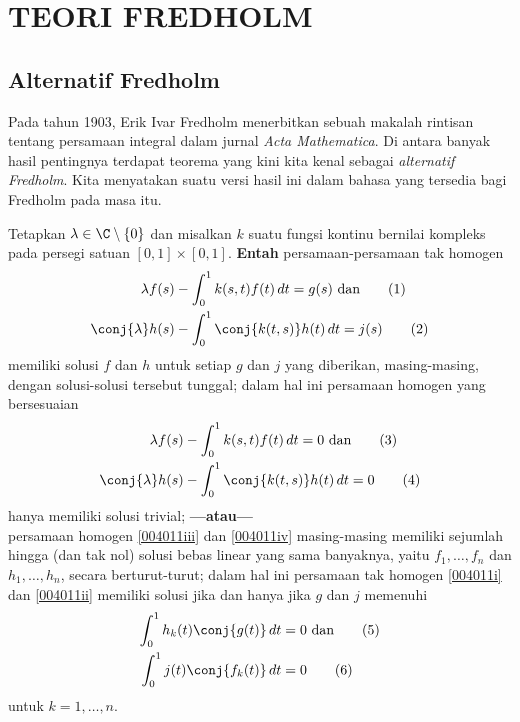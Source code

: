 \chapter{TEORI FREDHOLM}

\section{Alternatif Fredholm}

Pada tahun 1903, Erik Ivar Fredholm menerbitkan sebuah makalah rintisan tentang persamaan integral dalam jurnal
\emph{Acta Mathematica}. Di antara banyak hasil pentingnya terdapat teorema yang kini kita kenal sebagai
\emph{alternatif Fredholm}. Kita menyatakan suatu versi hasil ini dalam bahasa
yang tersedia bagi Fredholm pada masa itu.

\begin{prop}\label{004011} Tetapkan $\lambda \in \C\setminus\{0\}$ dan misalkan $k$ suatu fungsi kontinu bernilai kompleks
pada persegi satuan $[0,1] \times [0,1]$. \textbf{Entah} persamaan-persamaan
tak homogen
 \begin{align}
   \lambda f(s) &- \int_0^1 k(s,t)f(t)\,dt = g(s)\label{004011i} \text{ dan}    \tag{1}\\
   \conj{\lambda} h(s) &- \int_0^1 \conj{k(t,s)}h(t)\,dt = j(s)\label{004011ii} \tag{2}
 \end{align}
memiliki solusi $f$ dan $h$ untuk setiap $g$ dan $j$ yang diberikan, masing-masing, dengan solusi-solusi tersebut
tunggal; dalam hal ini persamaan homogen yang bersesuaian
 \begin{align} \lambda f(s) &- \int_0^1 k(s,t)f(t)\,dt = 0\label{004011iii} \text{ dan} \tag{3}\\
        \conj{\lambda} h(s) &- \int_0^1 \conj{k(t,s)}h(t)\,dt = 0\label{004011iv} \tag{4}
 \end{align}
hanya memiliki solusi trivial; \textbf{---atau---}\\
persamaan homogen \eqref{004011iii} dan \eqref{004011iv} masing-masing memiliki
sejumlah hingga (dan tak nol) solusi bebas linear yang sama banyaknya, yaitu $f_1,\dots,f_n$ dan $h_1,\dots,h_n$,
secara berturut-turut; dalam hal ini persamaan tak homogen \eqref{004011i} dan
\eqref{004011ii} memiliki solusi jika dan hanya jika $g$ dan $j$ memenuhi
 \begin{align} \int_0^1 h_k(t)\conj{g(t)}\,dt &= 0\label{004011v} \text{ dan} \tag{5}\\
              \int_0^1 j(t) \conj{f_k(t)}\,dt &= 0\label{004011vi} \tag{6}
 \end{align}
untuk $k = 1, \dots, n$.
\end{prop}

